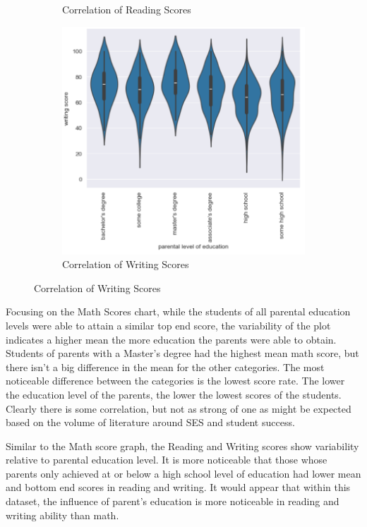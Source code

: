 \documentclass[fleqn,10pt]{olplainarticle}
\begin{document}
\begin{figure}[h!]
\begin{subfigure}{0.3\textwidth}
    \caption{Correlation of Reading Scores}
    \label{fig:view}
    \end{subfigure}
    \begin{subfigure}{0.3\textwidth}
    \includegraphics[width=\linewidth]{WritingVsParent.png}
    \caption{Correlation of Writing Scores}
    \label{fig:view}
    \end{subfigure}
\end{figure}

Focusing on the Math Scores chart, while the students of all parental education levels were able to attain a similar top end score, the variability of the plot indicates a higher mean the more education the parents were able to obtain.  Students of parents with a Master's degree had the highest mean math score, but there isn't a big difference in the mean for the other categories.  The most noticeable difference between the categories is the lowest score rate. The lower the education level of the parents, the lower the lowest scores of the students.  Clearly there is some correlation, but not as strong of one as might be expected based on the volume of literature around SES and student success.

Similar to the Math score graph, the Reading and Writing scores show variability relative to parental education level.  It is more noticeable that those whose parents only achieved at or below a high school level of education had lower mean and bottom end scores in reading and writing. It would appear that within this dataset, the influence of parent's education is more noticeable in reading and writing ability than math.
\end{document}
